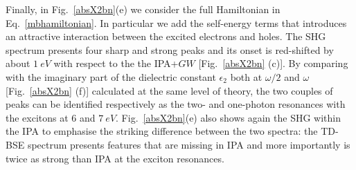 Finally, in Fig.~\ref{absX2bn}(e) we consider the full Hamiltonian in Eq.~\eqref{mbhamiltonian}. In particular we add the self-energy terms that introduces an attractive interaction between the excited electrons and holes\cite{strinati}. The SHG spectrum presents four sharp and strong peaks and its onset is red-shifted by about $1~eV$ with respect to the the IPA+$GW$ [Fig.~\ref{absX2bn} (c)]. By comparing with the imaginary part of the dielectric constant $\epsilon_2$ both at $\omega/2$ and  $\omega$ [Fig.~\ref{absX2bn} (f)] calculated at the same level of theory, the two couples of peaks can be identified respectively as the two- and one-photon resonances with the excitons at $6$ and $7~eV$.  Fig.~\ref{absX2bn}(e) also shows again the SHG within the IPA to emphasise the striking difference between the two spectra: the TD-BSE spectrum presents features that are missing in IPA and more importantly is twice as strong than IPA at the exciton resonances. 





